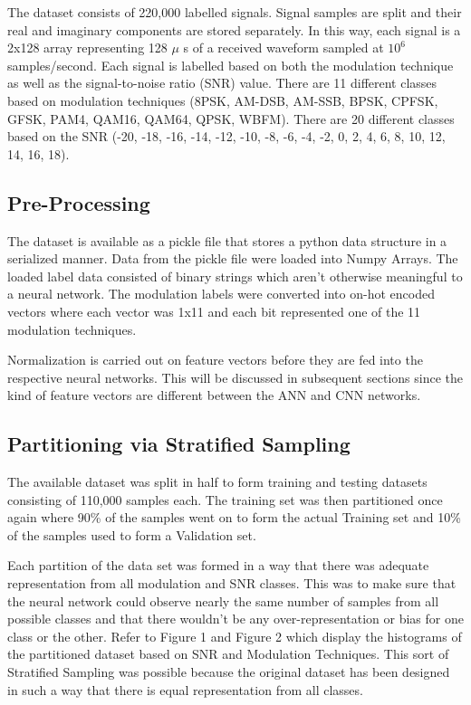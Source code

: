\documentclass[12pt,journal,onecolumn,twoside]{IEEEtran}
\begin{document}
The dataset consists of 220,000 labelled signals. Signal samples are split and their real and imaginary components are stored separately. In this way, each signal is a 2x128 array representing 128 $\mu$ s of a received waveform sampled at $10^{6}$ samples/second. Each signal is labelled based on both the modulation technique as well as the signal-to-noise ratio (SNR) value. There are 11 different classes based on modulation techniques  (8PSK, AM-DSB, AM-SSB, BPSK, CPFSK, GFSK, PAM4, QAM16, QAM64, QPSK, WBFM). There are 20 different classes based on the SNR (-20, -18, -16, -14, -12, -10, -8, -6, -4, -2, 0, 2, 4, 6, 8, 10, 12, 14, 16, 18).

\subsection{Pre-Processing}

The dataset is available as a pickle file that stores a python data structure in a serialized manner. Data from the pickle file were loaded into Numpy Arrays. The loaded label data consisted of binary strings which aren't otherwise meaningful to a neural network. The modulation labels were converted into on-hot encoded vectors where each vector was 1x11 and each bit represented one of the 11 modulation techniques.

Normalization is carried out on feature vectors before they are fed into the respective neural networks. This will be discussed in subsequent sections since the kind of feature vectors are different between the ANN and CNN networks.

\subsection{Partitioning via Stratified Sampling}

The available dataset was split in half to form training and testing datasets consisting of 110,000 samples each. The training set was then partitioned once again where 90\% of the samples went on to form the actual Training set and 10\% of the samples used to form a Validation set.

Each partition of the data set was formed in a way that there was adequate representation from all modulation and SNR classes. This was to make sure that the neural network could observe nearly the same number of samples from all possible classes and that there wouldn't be any over-representation or bias for one class or the other. Refer to Figure 1 and Figure 2 which display the histograms of the partitioned dataset based on SNR and Modulation Techniques. This sort of Stratified Sampling \cite{stratSamp} was possible because the original dataset has been designed in such a way that there is equal representation from all classes.
\end{document}
